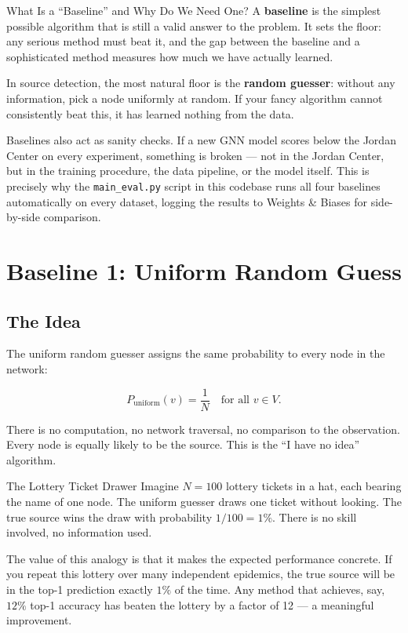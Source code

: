 \begin{conceptbox}{What Is a ``Baseline'' and Why Do We Need One?}
A \textbf{baseline} is the simplest possible algorithm that is still a valid answer to
the problem. It sets the floor: any serious method must beat it, and the gap between
the baseline and a sophisticated method measures how much we have actually learned.

In source detection, the most natural floor is the \textbf{random guesser}: without any
information, pick a node uniformly at random. If your fancy algorithm cannot consistently
beat this, it has learned nothing from the data.

Baselines also act as sanity checks. If a new GNN model scores below the Jordan Center
on every experiment, something is broken --- not in the Jordan Center, but in the
training procedure, the data pipeline, or the model itself. This is precisely why the
\texttt{main\_eval.py} script in this codebase runs all four baselines automatically on
every dataset, logging the results to Weights \& Biases for side-by-side comparison.
\end{conceptbox}

\section{Baseline 1: Uniform Random Guess}
\label{sec:uniform}

\subsection{The Idea}

The uniform random guesser assigns the same probability to every node in the network:

\begin{equation}
  P_{\text{uniform}}(v) = \frac{1}{N} \quad \text{for all } v \in V.
  \label{eq:uniform}
\end{equation}

There is no computation, no network traversal, no comparison to the observation. Every
node is equally likely to be the source. This is the ``I have no idea'' algorithm.

\begin{analogybox}{The Lottery Ticket Drawer}
Imagine $N = 100$ lottery tickets in a hat, each bearing the name of one node. The
uniform guesser draws one ticket without looking. The true source wins the draw with
probability $1/100 = 1\%$. There is no skill involved, no information used.

The value of this analogy is that it makes the expected performance concrete. If you
repeat this lottery over many independent epidemics, the true source will be in the
top-1 prediction exactly $1\%$ of the time. Any method that achieves, say, $12\%$
top-1 accuracy has beaten the lottery by a factor of 12 --- a meaningful improvement.
\end{analogybox}

